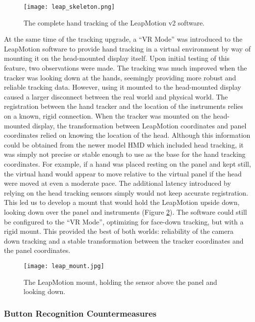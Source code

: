 \begin{figure}
    \centering
    \texttt{[image: leap\_skeleton.png]}
    \caption{The complete hand tracking of the LeapMotion v2 software.}
    \label{fig:proto_skeleton}
\end{figure}

At the same time of the tracking upgrade, a ``VR Mode'' was introduced to the LeapMotion software to provide hand tracking in a virtual environment by way of mounting it on the head-mounted display itself.
Upon initial testing of this feature, two observations were made.
The tracking was much improved when the tracker was looking down at the hands, seemingly providing more robust and reliable tracking data.
However, using it mounted to the head-mounted display caused a larger disconnect between the real world and physical world.
The registration between the hand tracker and the location of the instruments relies on a known, rigid connection.
When the tracker was mounted on the head-mounted display, the transformation between LeapMotion coordinates and panel coordinates relied on knowing the location of the head.
Although this information could be obtained from the newer model HMD which included head tracking, it was simply not precise or stable enough to use as the base for the hand tracking coordinates.
For example, if a hand was placed resting on the panel and kept still, the virtual hand would appear to move relative to the virtual panel if the head were moved at even a moderate pace.
The additional latency introduced by relying on the head tracking sensors simply would not keep accurate registration.
This led us to develop a mount that would hold the LeapMotion upside down, looking down over the panel and instruments (Figure \ref{fig:proto_leap_mount}).
The software could still be configured to the ``VR Mode'', optimizing for face-down tracking, but with a rigid mount.
This provided the best of both worlds: reliability of the camera down tracking and a stable transformation between the tracker coordinates and the panel coordinates.

\begin{figure}
    \centering
    \texttt{[image: leap\_mount.jpg]}
    \caption{The LeapMotion mount, holding the sensor above the panel and looking down.}
    \label{fig:proto_leap_mount}
\end{figure}

\subsubsection{Button Recognition Countermeasures}

